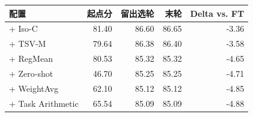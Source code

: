 \begin{tabular}{@{}lrrrr@{}}
\toprule
配置 & 起点分 & 留出选轮 & 末轮 & Delta vs. FT \\
\midrule
\method{} + Iso-C & 81.40 & 86.60 & 86.65 & -3.36 \\
\method{} + TSV-M & 79.64 & 86.38 & 86.40 & -3.58 \\
\method{} + RegMean & 80.53 & 85.32 & 85.32 & -4.65 \\
\method{} + Zero-shot & 46.70 & 85.25 & 85.25 & -4.71 \\
\method{} + WeightAvg & 62.10 & 85.12 & 85.12 & -4.85 \\
\method{} + Task Arithmetic & 65.54 & 85.09 & 85.09 & -4.88 \\
\bottomrule
\end{tabular}
